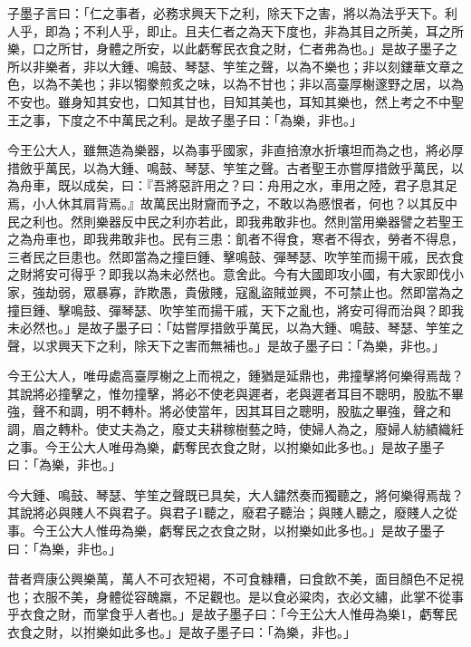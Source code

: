 
\begin{pinyinscope}
子墨子言曰：「仁之事者，必務求興天下之利，除天下之害，將以為法乎天下。利人乎，即為；不利人乎，即止。且夫仁者之為天下度也，非為其目之所美，耳之所樂，口之所甘，身體之所安，以此虧奪民衣食之財，仁者弗為也。」是故子墨子之所以非樂者，非以大鍾、鳴鼓、琴瑟、竽笙之聲，以為不樂也；非以刻鏤華文章之色，以為不美也；非以犓豢煎炙之味，以為不甘也；非以高臺厚榭邃野之居，以為不安也。雖身知其安也，口知其甘也，目知其美也，耳知其樂也，然上考之不中聖王之事，下度之不中萬民之利。是故子墨子曰：「為樂，非也。」

今王公大人，雖無造為樂器，以為事乎國家，非直掊潦水折壤坦而為之也，將必厚措斂乎萬民，以為大鍾、鳴鼓、琴瑟、竽笙之聲。古者聖王亦嘗厚措斂乎萬民，以為舟車，既以成矣，曰：『吾將惡許用之？曰：舟用之水，車用之陸，君子息其足焉，小人休其肩背焉。』故萬民出財齎而予之，不敢以為慼恨者，何也？以其反中民之利也。然則樂器反中民之利亦若此，即我弗敢非也。然則當用樂器譬之若聖王之為舟車也，即我弗敢非也。民有三患：飢者不得食，寒者不得衣，勞者不得息，三者民之巨患也。然即當為之撞巨鍾、擊鳴鼓、彈琴瑟、吹竽笙而揚干戚，民衣食之財將安可得乎？即我以為未必然也。意舍此。今有大國即攻小國，有大家即伐小家，強劫弱，眾暴寡，詐欺愚，貴傲賤，寇亂盜賊並興，不可禁止也。然即當為之撞巨鍾、擊鳴鼓、彈琴瑟、吹竽笙而揚干戚，天下之亂也，將安可得而治與？即我未必然也。」是故子墨子曰：「姑嘗厚措斂乎萬民，以為大鍾、鳴鼓、琴瑟、竽笙之聲，以求興天下之利，除天下之害而無補也。」是故子墨子曰：「為樂，非也。」

今王公大人，唯毋處高臺厚榭之上而視之，鍾猶是延鼎也，弗撞擊將何樂得焉哉？其說將必撞擊之，惟勿撞擊，將必不使老與遲者，老與遲者耳目不聰明，股肱不畢強，聲不和調，明不轉朴。將必使當年，因其耳目之聰明，股肱之畢強，聲之和調，眉之轉朴。使丈夫為之，廢丈夫耕稼樹藝之時，使婦人為之，廢婦人紡績織紝之事。今王公大人唯毋為樂，虧奪民衣食之財，以拊樂如此多也。」是故子墨子曰：「為樂，非也。」

今大鍾、鳴鼓、琴瑟、竽笙之聲既已具矣，大人鏽然奏而獨聽之，將何樂得焉哉？其說將必與賤人不與君子。與君子1聽之，廢君子聽治；與賤人聽之，廢賤人之從事。今王公大人惟毋為樂，虧奪民之衣食之財，以拊樂如此多也。」是故子墨子曰：「為樂，非也。」

昔者齊康公興樂萬，萬人不可衣短褐，不可食糠糟，曰食飲不美，面目顏色不足視也；衣服不美，身體從容醜羸，不足觀也。是以食必粱肉，衣必文繡，此掌不從事乎衣食之財，而掌食乎人者也。」是故子墨子曰：「今王公大人惟毋為樂1，虧奪民衣食之財，以拊樂如此多也。」是故子墨子曰：「為樂，非也。」


\end{pinyinscope}
